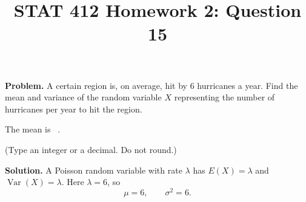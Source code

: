 \documentclass[11pt]{article}
\title{STAT 412 Homework 2: Question 15}
\author{}
\date{}
\begin{document}
\maketitle
\textbf{Problem.} A certain region is, on average, hit by 6 hurricanes a year.
Find the mean and variance of the random variable \(X\) representing the number
of hurricanes per year to hit the region.

The mean is \(\boxed{\phantom{0}}\).

(Type an integer or a decimal. Do not round.)

\textbf{Solution.} A Poisson random variable with rate \(\lambda\) has
\(E(X)=\lambda\) and \(\operatorname{Var}(X)=\lambda\). Here \(\lambda=6\), so
\[
\boxed{\mu=6,\qquad \sigma^2=6}.
\]
\end{document}
